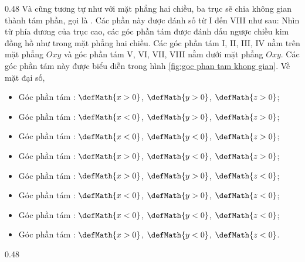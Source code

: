 {
   \begin{minipageindent}{0.48\textwidth}
      Và cũng tương tự như với mặt phẳng hai chiều, ba trục sẽ chia không gian thành tám phần, gọi là . Các phần này được đánh số từ I đến VIII như sau: Nhìn từ phía dương của trục cao, các góc phần tám được đánh dấu ngược chiều kim đồng hồ như trong mặt phẳng hai chiều. Các góc phần tám I, II, III, IV nằm trên mặt phẳng $Oxy$ và góc phần tám V, VI, VII, VIII nằm dưới mặt phẳng $Oxy$. Các góc phần tám này được biểu diễn trong hình \ref{fig:goc phan tam khong gian}. Về mặt đại số, 

      \begin{itemize}
         \item Góc phần tám : $\defMath{x>0}$, $\defMath{y>0}$, $\defMath{z>0}$;
         \item Góc phần tám : $\defMath{x<0}$, $\defMath{y>0}$, $\defMath{z>0}$;
         \item Góc phần tám : $\defMath{x<0}$, $\defMath{y<0}$, $\defMath{z>0}$;
         \item Góc phần tám : $\defMath{x>0}$, $\defMath{y<0}$, $\defMath{z>0}$;
         \item Góc phần tám : $\defMath{x>0}$, $\defMath{y>0}$, $\defMath{z<0}$;
         \item Góc phần tám : $\defMath{x<0}$, $\defMath{y>0}$, $\defMath{z<0}$;
         \item Góc phần tám : $\defMath{x<0}$, $\defMath{y<0}$, $\defMath{z<0}$;
         \item Góc phần tám : $\defMath{x>0}$, $\defMath{y<0}$, $\defMath{z<0}$.
      \end{itemize}
   \end{minipageindent}
   \hfill
   \begin{minipageindent}{0.48\textwidth}
      \begin{figure}[H]
         \centering
\end{figure}
\end{minipageindent}}
